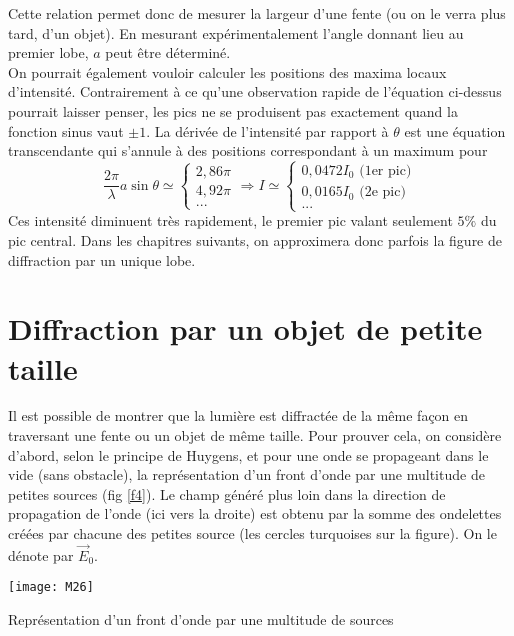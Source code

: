 \noindent Cette relation permet donc de mesurer la largeur d'une fente (ou on le verra plus tard, d'un objet). En mesurant expérimentalement l'angle donnant lieu au premier lobe, $a$ peut être déterminé.\\

\noindent On pourrait également vouloir calculer les positions des maxima locaux d'intensité. Contrairement à ce qu'une observation rapide de l'équation ci-dessus pourrait laisser penser, les pics ne se produisent pas exactement quand la fonction sinus vaut $\pm1$. La dérivée de l'intensité par rapport à $\theta$ est une équation transcendante qui s'annule à des positions correspondant à un maximum pour 
\[
\frac{2\pi}{\lambda}a \sin\theta\simeq
\left\{
\begin{array}{c}
 2,86\pi\\
 4,92\pi    \\
...
\end{array}
\right.
\Longrightarrow
I\simeq
\left\{
\begin{array}{c}
 0,0472I_0 \mbox{ (1er pic)}\\
 0,0165I_0 \mbox{ (2e pic)}\\   
  ...
\end{array}
\right.
\]
Ces intensité diminuent très rapidement, le premier pic valant seulement $5\%$ du pic central. Dans les chapitres suivants, on approximera donc parfois la figure de diffraction par un unique lobe.

\section{Diffraction par un objet de petite taille}

Il est possible de montrer que la lumière est diffractée de la même façon en traversant une fente ou un objet de même taille. Pour prouver cela, on considère d'abord, selon le principe de Huygens, et pour une onde se propageant dans le vide (sans obstacle), la représentation d'un front d'onde par une multitude de petites sources (fig \ref{f4}). Le champ généré plus loin dans la direction de propagation de l'onde (ici vers la droite) est obtenu par la somme des ondelettes créées par chacune des petites source (les cercles turquoises sur la figure). On le dénote par $\overset\rightarrow{E}_0$.

\begin{marginfigure}[0cm]
\texttt{[image: M26]}
\caption{Représentation d'un front d'onde par une multitude de sources}
\label{f4}
\end{marginfigure}


